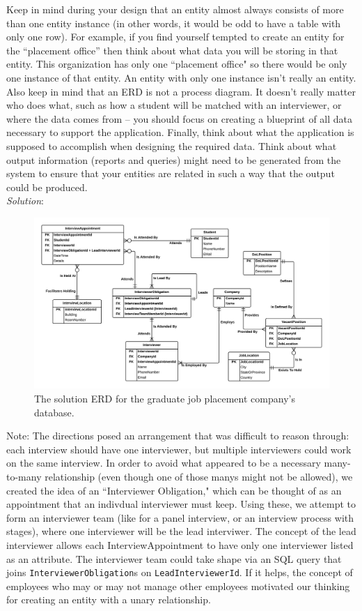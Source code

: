 \documentclass{article}
\begin{document}
Keep in mind during your design that an entity almost always consists of more than one entity instance (in other words, it would be odd to have a table with only one row). For example, if you find yourself tempted to create an entity for the “placement office” then think about what data you will be storing in that entity. This organization has only one ``placement office" so there would be only one instance of that entity. An entity with only one instance isn’t really an entity. Also keep in mind that an ERD is not a process diagram. It doesn’t really matter who does what, such as how a student will be matched with an interviewer, or where the data comes from – you should focus on creating a blueprint of all data necessary to support the application. Finally, think about what the application is supposed to accomplish when designing the required data. Think about what output information (reports and queries) might need to be generated from the system to ensure that your entities are related in such a way that the output could be produced. \\

\newpage
\textit{Solution}:\\

  \begin{figure}[h!]
    \centering
    \includegraphics[width=.95\linewidth]{HW07_Exercise02_ERD}
    \caption{The solution ERD for the graduate job placement company's database.}
    \label{fig:HW07_Ex02}
  \end{figure}

Note: The directions posed an arrangement that was difficult to reason through: each interview should have one interviewer, but multiple interviewers could work on the same interview. In order to avoid what appeared to be a necessary many-to-many relationship (even though one of those manys might not be allowed), we created the idea of an ``Interviewer Obligation," which can be thought of as an appointment that an indivdual interviewer must keep. Using these, we attempt to form an interviewer team (like for a panel interview, or an interview process with stages), where one interviewer will be the lead interviwer. The concept of the lead interviewer allows each InterviewAppointment to have only one interviewer listed as an attribute. The interviewer team could take shape via an SQL query that joins \texttt{InterviewerObligation}s on \texttt{LeadInterviewerId}. If it helps, the concept of employees who may or may not manage other employees motivated our thinking for creating an entity with a unary relationship.
\end{document}
